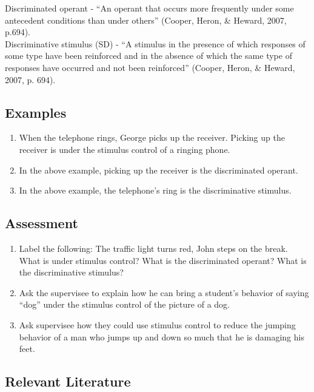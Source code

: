Discriminated operant - ``An operant that occurs more frequently under some antecedent conditions than under others'' (Cooper, Heron, \& Heward, 2007, p.694).\\

Discriminative stimulus (SD) - ``A stimulus in the presence of which responses of some type have been reinforced and in the absence of which the same type of responses have occurred and not been reinforced''  (Cooper, Heron, \& Heward, 2007, p. 694).

\subsection{Examples}
\begin{enumerate}
\item When the telephone rings, George picks up the receiver.  Picking up the receiver is under the stimulus control of a ringing phone. 
\item In the above example, picking up the receiver is the discriminated operant. 
\item In the above example, the telephone's ring is the discriminative stimulus.
%
\end{enumerate}
%
\subsection{Assessment}
\begin{enumerate}
\item Label the following:  The traffic light turns red, John steps on the break.  What is under stimulus control? What is the discriminated operant?  What is the discriminative stimulus? 
\item Ask the supervisee to explain how he can bring a student's behavior of saying ``dog'' under the stimulus control of the picture of a dog.
\item Ask supervisee how they could use stimulus control to reduce the jumping behavior of a man who jumps up and down so much that he is damaging his feet.
%
\end{enumerate}
%
\subsection{Relevant Literature}
\begin{refsection}
\nocite{test,alang2017police,clayton2018black}
\printbibliography[heading=none]
\end{refsection} 
%
